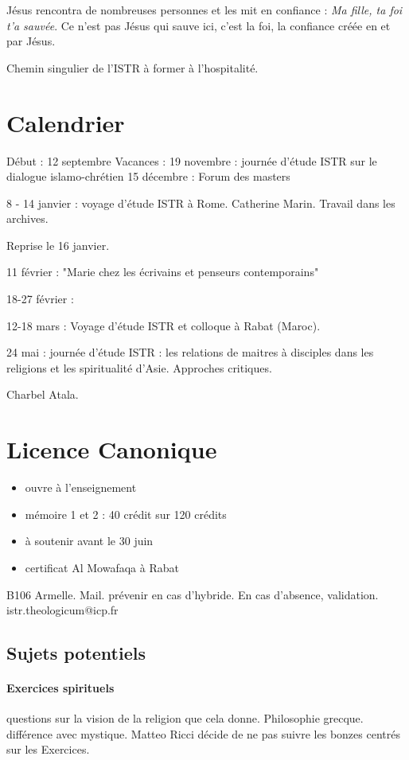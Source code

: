 Jésus rencontra de nombreuses personnes et les mit en confiance : \textit{Ma fille, ta foi t'a sauvée}. Ce n'est pas Jésus qui sauve ici, c'est la foi, la confiance créée en et par Jésus.

Chemin singulier de l'ISTR à former à l'hospitalité.


\section{Calendrier}
Début : 12 septembre
Vacances : 
19 novembre : journée d'étude ISTR sur le dialogue islamo-chrétien
15 décembre : Forum des masters

8 - 14 janvier : voyage d'étude ISTR à Rome. Catherine Marin. Travail dans les archives.

Reprise le 16 janvier. 

11 février : "Marie chez les écrivains et penseurs contemporains"

18-27 février :


12-18 mars : Voyage d'étude ISTR et colloque à Rabat (Maroc).

24 mai : journée d'étude ISTR : les relations de maitres à disciples dans les religions et les spiritualité d'Asie. Approches critiques.

Charbel Atala. 

\section{Licence Canonique}

\begin{itemize}
   \item ouvre à l'enseignement
\item mémoire 1 et 2 : 40 crédit sur 120 crédits
\item à soutenir avant le 30 juin
\item certificat Al Mowafaqa à Rabat
\end{itemize}


B106 Armelle. Mail. prévenir en cas d'hybride. En cas d'absence, validation.  istr.theologicum@icp.fr

\subsection{Sujets potentiels}

\paragraph{Exercices spirituels} questions sur la vision de la religion que cela donne. Philosophie grecque. différence avec mystique. Matteo Ricci décide de ne pas suivre les bonzes centrés sur les Exercices. 

